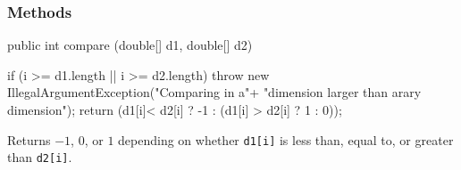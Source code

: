 \subsubsection* {Methods}
\begin{code}

   public int compare (double[] d1, double[] d2) \begin{hide} {
      if (i >= d1.length || i >= d2.length)
         throw new IllegalArgumentException("Comparing in a"+
                    "dimension larger than arary dimension");
      return (d1[i]< d2[i] ? -1 : (d1[i] > d2[i] ? 1 : 0));
   } \end{hide}
\end{code}
\begin{tabb}
Returns $-1$, $0$, or $1$ depending on
whether  \texttt{d1[i]} is less than, equal
to, or greater than \texttt{d2[i]}.
\end{tabb}
\begin{htmlonly}
\end{htmlonly}
\begin{code}\begin{hide}
}
\end{hide}\end{code}
